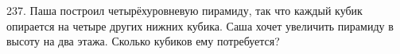237. Паша построил четырёхуровневую пирамиду, так что каждый кубик опирается на четыре других нижних кубика. Саша хочет увеличить пирамиду в высоту на два этажа. Сколько кубиков ему потребуется?\\
